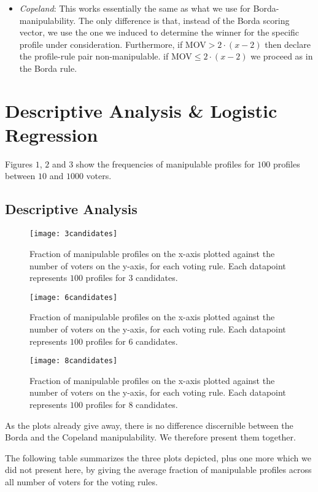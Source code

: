 \documentclass[10pt,a4paper]{article}
\begin{document}
\begin{itemize}
\begin{enumerate}
\end{enumerate}
\item \textit{Copeland}: This works essentially the same as what we use for Borda-manipulability. The only difference is that, instead of the Borda scoring vector, we use the one we induced to determine the winner for the specific profile under consideration. Furthermore, if MOV$>2\cdot (x-2)$ then declare the profile-rule pair non-manipulable. if MOV$\leq 2\cdot (x-2)$ we proceed as in the Borda rule.
\end{itemize}
\section{Descriptive Analysis \& Logistic Regression}
Figures $1$, $2$ and $3$ show the frequencies of manipulable profiles for $100$ profiles between $10$ and $1000$ voters.
\subsection{Descriptive Analysis}
\begin{SCfigure}[0.5][h]
\caption{Fraction of manipulable profiles on the x-axis plotted against the number of voters on the y-axis, for each voting rule. Each datapoint represents $100$ profiles for $3$ candidates.}
\texttt{[image: 3candidates]}
\end{SCfigure}

\begin{SCfigure}[0.5][h]
\caption{Fraction of manipulable profiles on the x-axis plotted against the number of voters on the y-axis, for each voting rule. Each datapoint represents $100$ profiles for $6$ candidates.}
\texttt{[image: 6candidates]}
\end{SCfigure}

\begin{SCfigure}[0.5][h]
\caption{Fraction of manipulable profiles on the x-axis plotted against the number of voters on the y-axis, for each voting rule. Each datapoint represents $100$ profiles for $8$ candidates.}
\texttt{[image: 8candidates]}
\end{SCfigure}

As the plots already give away, there is no difference discernible between the Borda and the Copeland manipulability. We therefore present them together. 

The following table summarizes the three plots depicted, plus one more which we did not present here, by giving the average fraction of manipulable profiles across all number of voters for the voting rules.
\end{document}
